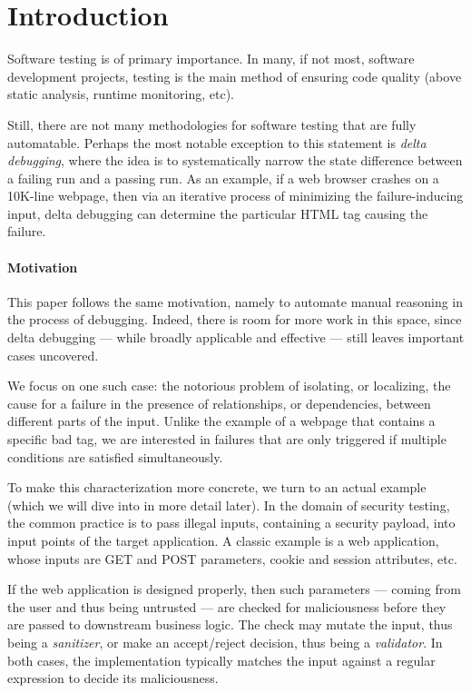 \section{Introduction}

Software testing is of primary importance. In many, if not most, software development projects, testing is the main method of ensuring code quality (above static analysis, runtime monitoring, etc).

Still, there are not many methodologies for software testing that are fully automatable. Perhaps the most notable exception to this statement is \emph{delta debugging}, where the idea is to systematically narrow the state difference between a failing run and a passing run. As an example, if a 
web browser crashes on a 10K-line webpage, then via an iterative process of minimizing the failure-inducing input, delta debugging can determine the particular HTML tag causing the failure.

\paragraph{Motivation} This paper follows the same motivation, namely to automate manual reasoning in the process of debugging. Indeed, there is room for more work in this space, since delta debugging --- while broadly applicable and effective --- still leaves important cases uncovered.

We focus on one such case: the notorious problem of isolating, or localizing, the cause for a failure in the presence of relationships, or dependencies, between different parts of the input. Unlike the example of a webpage that contains a specific bad tag, we are interested in failures that are only triggered if multiple conditions are satisfied simultaneously.

To make this characterization more concrete, we turn to an actual example (which we will dive into in more detail later). In the domain of security testing, the common practice is to pass illegal inputs, containing a security payload, into input points of the target application. A classic example is a web application, whose inputs are GET and POST parameters, cookie and session attributes, etc.

If the web application is designed properly, then such parameters --- coming from the user and thus being untrusted --- are checked for maliciousness before they are passed to downstream business logic. The check may mutate the input, thus being a \emph{sanitizer}, or make an accept/reject decision, thus being a \emph{validator}. In both cases, the implementation typically matches the input against a regular expression to decide its maliciousness.

